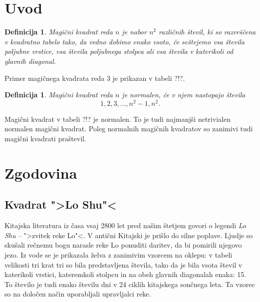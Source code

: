\documentclass[a4paper,12pt]{article}
\newtheorem{definicija}[izrek]{Definicija}
\begin{document}
\newpage

\section{Uvod}

\begin{definicija}
   \emph{Magični kvadrat} reda $n$ je nabor $n^2$ različnih števil,
   ki so razvrščena v kvadratno tabelo tako, da vedno dobimo enako vsoto,
   če seštejemo vsa števila poljubne vrstice, vsa števila poljubnega
   stolpca ali vsa števila v katerikoli od glavnih diagonal.
\end{definicija}

Primer magičnega kvadrata reda 3 je prikazan v tabeli ?!?.


\begin{definicija}
   Magični kvadrat reda $n$ je \emph{normalen}, če v njem nastopajo števila
   \begin{equation}
      1, 2, 3, \ldots, n^2-1, n^2.
   \end{equation}
\end{definicija}

Magični kvadrat v tabeli ?!? je normalen.
To je tudi najmanjši netrivialen normalen magični kvadrat.
Poleg normalnih magičnih kvadratov so zanimivi tudi magični kvadrati praštevil.


\section{Zgodovina}

\subsection{Kvadrat ">Lo Shu"<}

Kitajska literatura iz časa vsaj 2800 let pred našim štetjem govori o legendi
\emph{Lo Shu} -- ">zvitek reke Lo"<. V antični Kitajski je prišlo do
silne poplave. Ljudje so skušali rečnemu bogu narasle reke Lo ponuditi daritev,
da bi pomirili njegovo jezo. Iz vode se je prikazala želva z zanimivim vzorcem
na oklepu: v tabeli velikosti tri krat tri so bila predstavljena števila, tako
da je bila vsota števil v katerikoli vrstici, kateremkoli stolpcu in na obeh
glavnih diagonalah enaka: 15. To število je tudi enako številu dni v 24 ciklih
kitajskega sončnega leta. Ta vzorec so na določen način uporabljali upravljalci
reke.
\end{document}
